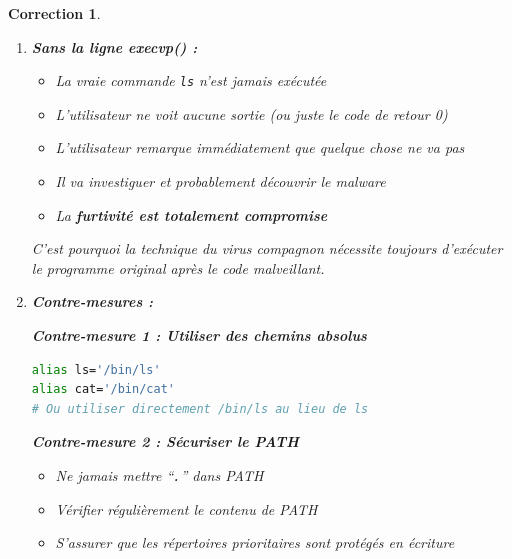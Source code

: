 \documentclass[a4paper,11pt]{article}
\theoremstyle{plain}
\newtheorem{correction}{Correction}
\theoremstyle{definition}
\begin{document}
\begin{correction}
\begin{enumerate}
\begin{attention}[title={Pourquoi ne jamais mettre ``\texttt{.}'' dans le PATH}]
Si le répertoire courant (\texttt{.}) est dans le PATH (surtout en première position), un attaquant peut placer un exécutable malveillant nommé \texttt{ls}, \texttt{cat}, ou \texttt{sudo} dans \textbf{n'importe quel répertoire} visité par la victime (ex : \texttt{/tmp}, un dossier partagé). Il suffit que la victime exécute une commande courante dans ce répertoire pour lancer le malware.

C'est pourquoi les distributions Linux modernes n'incluent \textbf{jamais} \texttt{.} dans le PATH par défaut. Sous Windows, le répertoire courant est cherché en premier, ce qui a historiquement causé de nombreuses vulnérabilités (DLL hijacking, etc.).
\end{attention}

\item \textbf{Sans la ligne execvp() :}

\begin{itemize}
\item La vraie commande \texttt{ls} n'est jamais exécutée
\item L'utilisateur ne voit aucune sortie (ou juste le code de retour 0)
\item L'utilisateur remarque immédiatement que quelque chose ne va pas
\item Il va investiguer et probablement découvrir le malware
\item La \textbf{furtivité est totalement compromise}
\end{itemize}

C'est pourquoi la technique du virus compagnon nécessite toujours d'exécuter le programme original après le code malveillant.

\item \textbf{Contre-mesures :}

\textbf{Contre-mesure 1 : Utiliser des chemins absolus}
\begin{lstlisting}[language=bash,numbers=none]
alias ls='/bin/ls'
alias cat='/bin/cat'
# Ou utiliser directement /bin/ls au lieu de ls
\end{lstlisting}

\textbf{Contre-mesure 2 : Sécuriser le PATH}
\begin{itemize}
\item Ne jamais mettre ``\texttt{.}'' dans PATH
\item Vérifier régulièrement le contenu de PATH
\item S'assurer que les répertoires prioritaires sont protégés en écriture
\end{itemize}


\end{enumerate}
\end{correction}
\end{document}
